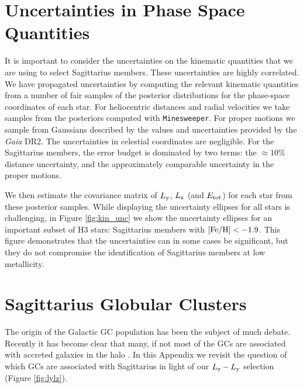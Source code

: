 \documentclass[twocolumn,tighten,twocolappendix]{aastex63}
\newcommand{\sgr}{Sagittarius}
\newcommand{\Ly}{L_{\rm y}}
\newcommand{\Lz}{L_{\rm z}}
\newcommand{\minesweeper}{\texttt{Minesweeper}}
\begin{document}
\begin{CJK*}{UTF8}{gbsn}
\begin{appendix}
\section{Uncertainties in Phase Space Quantities}
\label{apx:unc}


It is important to consider the uncertainties on the kinematic quantities that we are using to select \sgr{} members.  These uncertainties are highly correlated. We have propagated uncertainties by computing the relevant kinematic quantities from a number of fair samples of the posterior distributions for the phase-space coordinates of each star.  For heliocentric distances and radial velocities we take samples from the posteriors computed with \minesweeper{}. For proper motions we sample from Gaussians described by the values and uncertainties provided by the \emph{Gaia} DR2.  The uncertainties in celestial coordinates are negligible.  For the \sgr{} members, the error budget is dominated by two terms: the $\approx10$\% distance uncertainty, and the approximately comparable uncertainty in the proper motions.

We then estimate the covariance matrix of $\Ly$, $\Lz$ (and $E_{\rm tot}$) for each star from these posterior samples.  While displaying the uncertainty ellipses for all stars is challenging, in Figure \ref{fig:kin_unc} we show the uncertainty ellipses for an important subset of H3 stars:  \sgr{} members with $[{\rm Fe/H}] < -1.9$.  This figure demonstrates that the uncertainties can in some cases be significant, but they do not compromise the identification of \sgr{} members at low metallicity.

\section{Sagittarius Globular Clusters}
\label{apx:globulars}


The origin of the Galactic GC population has been the subject of much debate.  Recently it has become clear that many, if not most of the GCs are associated with accreted galaxies in the halo \citep[e.g.,][]{Bellazzini03, Law10b, Myeong19, Massari19, Kruijssen20}.  In this Appendix we revisit the question of which GCs are associated with \sgr{} in light of our $\Lz-\Ly$ selection (Figure \ref{fig:lylz}).


\end{appendix}
\end{CJK*}
\end{document}
